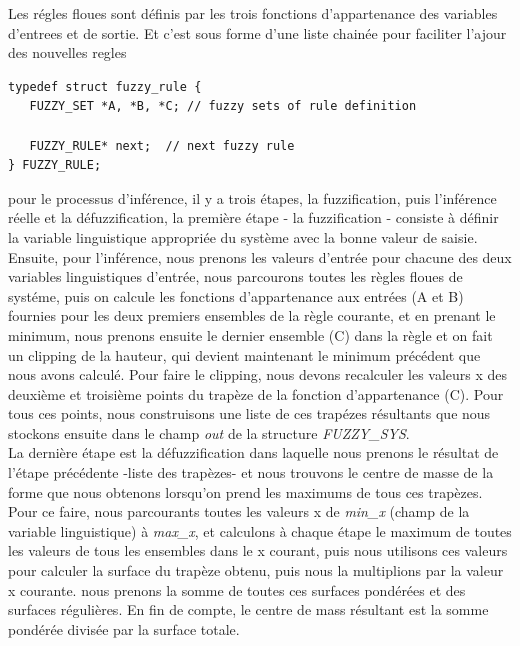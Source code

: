 \documentclass{article}
\begin{document}
Les régles floues sont définis par les trois fonctions d'appartenance des
variables d'entrees et de sortie. Et c'est sous forme d'une liste chainée pour
faciliter l'ajour des nouvelles regles

\begin{lstlisting}
typedef struct fuzzy_rule {
   FUZZY_SET *A, *B, *C; // fuzzy sets of rule definition

   FUZZY_RULE* next;  // next fuzzy rule
} FUZZY_RULE;
\end{lstlisting}


pour le processus d'inférence, il y a trois étapes, la fuzzification, puis
l'inférence réelle et la défuzzification, la première étape - la fuzzification
- consiste à définir la variable linguistique appropriée du système avec la
bonne valeur de saisie. \\

Ensuite, pour l'inférence, nous prenons les valeurs d'entrée pour chacune des
deux variables linguistiques d'entrée, nous parcourons toutes les règles
floues de systéme, puis on calcule les fonctions d'appartenance aux entrées (A
et B) 
fournies pour les deux premiers ensembles de la règle courante, et en prenant le
minimum, nous prenons ensuite le dernier ensemble (C) dans la règle et on fait
un clipping de la hauteur, qui devient maintenant le minimum précédent que nous avons calculé.
Pour faire le clipping, nous devons recalculer les valeurs x des deuxième
et troisième points du trapèze de la fonction d'appartenance (C). Pour tous ces
points, nous construisons une liste de ces trapézes résultants que nous stockons
ensuite dans le champ \textit{out} de la structure \textit{FUZZY\_SYS}. \\

La dernière étape est la défuzzification dans laquelle nous prenons le résultat
de l'étape précédente -liste des trapèzes- et nous trouvons le centre de masse
de la forme que nous obtenons lorsqu'on prend les maximums de tous ces
trapèzes. Pour ce faire, nous parcourants toutes les valeurs x de
\textit{min\_x}
(champ de la variable linguistique) à \textit{max\_x}, et calculons à chaque étape le
maximum de toutes les valeurs de tous les ensembles dans le x courant, puis nous utilisons ces
valeurs pour calculer la surface du trapèze obtenu, puis nous la multiplions
par la valeur x courante. nous prenons la somme de toutes ces surfaces
pondérées et des surfaces régulières. En fin de compte, le centre de mass résultant
est la somme pondérée divisée par la surface totale. \\
\end{document}
